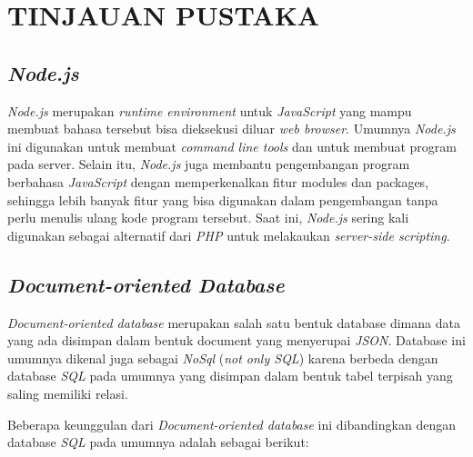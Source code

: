 \chapter{TINJAUAN PUSTAKA}
\vspace{4ex}

\setlength{\parindent}{7ex}


\section{\emph{Node.js}}
\vspace{1ex}

\emph{Node.js} merupakan \emph{runtime environment} untuk \emph{JavaScript} yang mampu membuat bahasa tersebut bisa dieksekusi diluar \emph{web browser}.
Umumnya \emph{Node.js} ini digunakan untuk membuat \emph{command line tools} dan untuk membuat program pada server.
Selain itu, \emph{Node.js} juga membantu pengembangan program berbahasa \emph{JavaScript} dengan memperkenalkan fitur modules dan packages, sehingga lebih banyak fitur yang bisa digunakan dalam pengembangan tanpa perlu menulis ulang kode program tersebut.
Saat ini, \emph{Node.js} sering kali digunakan sebagai alternatif dari \emph{PHP} untuk melakaukan \emph{server-side scripting}.
\vspace{0.5ex}

\section{\emph{Document-oriented Database}}
\vspace{1ex}

\emph{Document-oriented database} merupakan salah satu bentuk database dimana data yang ada disimpan dalam bentuk document yang menyerupai \emph{JSON}.
Database ini umumnya dikenal juga sebagai \emph{NoSql} (\emph{not only SQL}) karena berbeda dengan database \emph{SQL} pada umumnya yang disimpan dalam bentuk tabel terpisah yang saling memiliki relasi.
\vspace{0.5ex}

Beberapa keunggulan dari \emph{Document-oriented database} ini dibandingkan dengan database \emph{SQL} pada umumnya adalah sebagai berikut:
\vspace{0.5ex}

